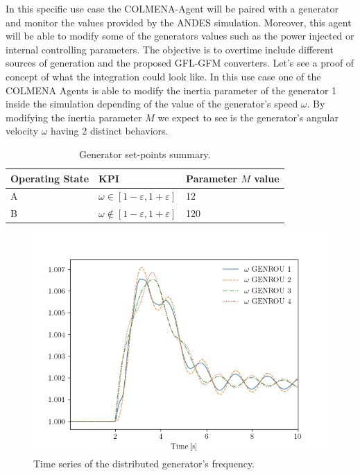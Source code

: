 \documentclass{article}
\begin{document}
In this specific use case the COLMENA-Agent will be paired with a generator and monitor the values provided by the ANDES simulation. Moreover, this agent will be able to modify some of the generators values such as the power injected or internal controlling parameters. The objective is to overtime include different sources of generation and the proposed GFL-GFM converters. Let's see a proof of concept of what the integration could look like. In this use case one of the COLMENA Agents is able to modify the inertia parameter of the generator 1 inside the simulation depending of the value of the generator's speed $\omega$. By modifying the inertia parameter $M$ we expect to see is the generator's angular velocity $\omega$ having 2 distinct behaviors.  

\begin{table}[H]
    \centering
    \begin{tabular}{|l|l|l|}
    \hline
    Operating State & KPI                              & Parameter $M$ value \\ \hline
    A               & $\omega \in [1 - \varepsilon, 1 + \varepsilon]$ & 12  \\ \hline
    B               & $\omega \notin [1 - \varepsilon, 1 + \varepsilon]$ & 120               \\ \hline
    \end{tabular}
    \caption{Generator set-points summary.}
\end{table}
  

\begin{figure}[h]  %
    \centering
    \includegraphics[width=1\textwidth]{pictures/plot.png}

    \caption{Time series of the distributed generator's frequency.}
    \label{fig:sample_figure2}
\end{figure}
\end{document}
